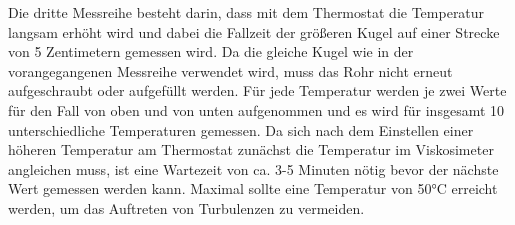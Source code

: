 %
Die dritte Messreihe besteht darin, dass mit dem Thermostat die Temperatur langsam erhöht wird
und dabei die Fallzeit der größeren Kugel auf einer Strecke von 5 Zentimetern gemessen wird.
Da die gleiche Kugel wie in der vorangegangenen Messreihe verwendet wird, muss das Rohr nicht erneut aufgeschraubt oder aufgefüllt werden.
Für jede Temperatur werden je zwei Werte für den Fall von oben und von unten aufgenommen und es wird für insgesamt 10 unterschiedliche Temperaturen gemessen.
Da sich nach dem Einstellen einer höheren Temperatur am Thermostat zunächst die Temperatur im Viskosimeter angleichen muss, 
ist eine Wartezeit von ca. 3-5 Minuten nötig bevor der nächste Wert gemessen werden kann.
 Maximal sollte eine Temperatur von 50°C erreicht werden, um das Auftreten von Turbulenzen zu vermeiden.
